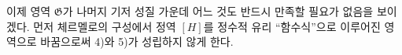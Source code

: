 
이제 영역 $\mathfrak G$가 나머지 기저 성질 가운데 어느 것도 반드시 만족할 필요가 없음을 보이겠다. 먼저 체르멜로의 구성에서 정역 $[H]$를 정수적 유리 ``함수식''으로 이루어진 영역으로 바꿈으로써 4)와 5)가 성립하지 않게 한다.
